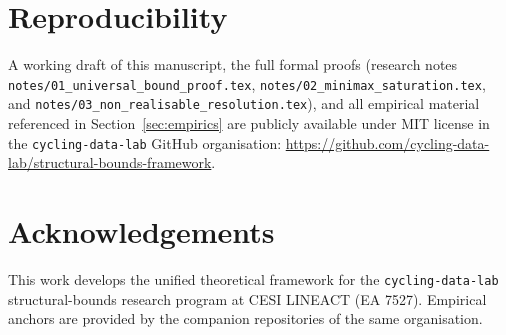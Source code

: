 \documentclass[11pt,a4paper]{article}
\theoremstyle{plain}
\theoremstyle{definition}
\theoremstyle{remark}
\begin{document}
\section*{Reproducibility}

A working draft of this manuscript, the full formal proofs (research
notes \texttt{notes/01\_universal\_bound\_proof.tex},
\texttt{notes/02\_minimax\_saturation.tex}, and
\texttt{notes/03\_non\_realisable\_resolution.tex}), and all empirical
material referenced in Section~\ref{sec:empirics} are publicly available
under MIT license in the \texttt{cycling-data-lab} GitHub organisation:
\url{https://github.com/cycling-data-lab/structural-bounds-framework}.

\section*{Acknowledgements}

This work develops the unified theoretical framework for the
\texttt{cycling-data-lab} structural-bounds research program at
CESI LINEACT (EA 7527).  Empirical anchors are provided by the
companion repositories of the same organisation.


\end{document}
